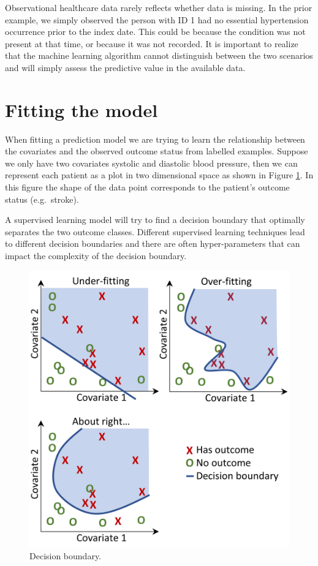 \documentclass[11pt]{book}
\theoremstyle{definition}
\theoremstyle{definition}
\theoremstyle{definition}
\theoremstyle{remark}
\begin{document}
Observational healthcare data rarely reflects whether data is missing. In the prior example, we simply observed the person with ID 1 had no essential hypertension occurrence prior to the index date. This could be because the condition was not present at that time, or because it was not recorded. It is important to realize that the machine learning algorithm cannot distinguish between the two scenarios and will simply assess the predictive value in the available data. 

\hypertarget{modelFitting}{%
\section{Fitting the model}\label{modelFitting}}

When fitting a prediction model we are trying to learn the relationship between the covariates and the observed outcome status from labelled examples. Suppose we only have two covariates systolic and diastolic blood pressure, then we can represent each patient as a plot in two dimensional space as shown in Figure \ref{fig:decisionBoundary}. In this figure the shape of the data point corresponds to the patient's outcome status (e.g.~stroke).

A supervised learning model will try to find a decision boundary that optimally separates the two outcome classes. Different supervised learning techniques lead to different decision boundaries and there are often hyper-parameters that can impact the complexity of the decision boundary. 

\begin{figure}

{\centering \includegraphics[width=0.8\linewidth]{images/PatientLevelPrediction/decisionBoundary} 

}

\caption{Decision boundary.}\label{fig:decisionBoundary}
\end{figure}
\end{document}
